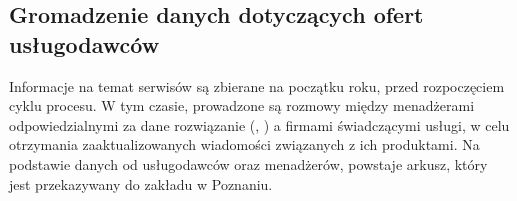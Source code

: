 \subsection{Gromadzenie danych dotyczących ofert usługodawców}
Informacje na temat serwisów są zbierane na początku roku, przed rozpoczęciem cyklu procesu. W tym czasie, prowadzone są rozmowy między menadżerami odpowiedzialnymi za dane rozwiązanie (, ) a firmami świadczącymi usługi, w celu otrzymania zaaktualizowanych wiadomości związanych z ich produktami. Na podstawie danych od usługodawców oraz menadżerów, powstaje arkusz, który jest przekazywany do zakładu w Poznaniu.